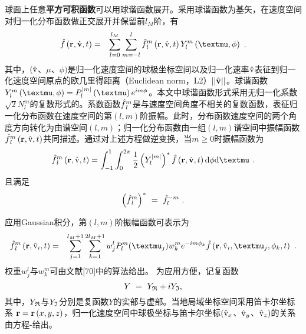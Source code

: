 \begin{theorem} \label{定理-球谐函数展开}
  球面上任意\textbf{平方可积函数}可以用球谐函数展开。采用球谐函数为基矢，在速度空间对归一化分布函数做正交展开并保留前$l_M$阶，有
  \begin{eqnarray}
      \fh \left(\r,\vh,t \right) &=& \sumloq \sumlnl \fhlm \left(\r, \rmvh ,t \right) \Ylm \left(\mu, \phi \right) ~. \label{fhsph}
  \end{eqnarray}
   其中，$(\hat{\mathrm{v}}$、$\mu$、$\phi )$是归一化速度空间的球极坐标空间以及归一化速率$\hat{\mathrm{v}}$表征到归一化速度空间原点的欧几里得距离（Euclidean norm，L2）$||\hat{\mathbf{v}}||$。球谐函数$\Ylm \left(\mu, \phi \right) = \Plmabs  \left(\mu \right) e^{i m \phi}$。本文中球谐函数形式采用无归一化系数$\sqrt{2} N_l^m$的复数形式的。系数函数$\hat{f}{_{l}^m}$是与速度空间角度不相关的复数函数，表征归一化分布函数在速度空间的第$(l,m)$阶振幅。此时，分布函数速度空间的两个角度方向转化为由谱空间$(l,m)$；归一化分布函数由一组$(l,m)$谱空间中振幅函数$\hat{f}{_{l}^m}\left(\mathbf{r}, \hat{\mathrm{v}} ,t \right)$共同描述。通过对上述方程做逆变换，当$m\ge0$时振幅函数为
   \begin{eqnarray}
       \fhlm \left(\r,\rmvh,t \right) =  \int_{-1}^1 \int_0^{2 \pi} \frac{1}{2} \left (Y_l^{\left |m \right|} \right)^* \fh \left (\r, \vh, t \right) \rmd \phi  \rmd \mu ~. \label{fhlm}
   \end{eqnarray}
   且满足
   \begin{equation}
       \left(\hat{f}{_{l}^m} \right)^* \ = \ \hat{f}_{l}^{-m} ~. \label{flmconj}
   \end{equation}
\end{theorem}

应用Gaussian积分，第$(l,m)$阶振幅函数可表示为
    \begin{eqnarray}
      \fhlm \left(\r,\rmvh_i,t \right)  & = & \sum_{j=1}^{l_M+1} \sum_{k=1}^{2l_M+1} w_j^l P_l^m (\mu_j) w_k^m e ^ {-i m \phi_k } \fh \left (\r, \rmvh_i,\mu_j,\phi_k, t \right) ~. \label{flmconjG}
    \end{eqnarray}
权重$w_j^l$与$w_k^m$可由文献[70]中的算法给出。
为应用方便，记复函数
   \begin{equation}
       Y \ = \ Y_{\mathfrak{R}} + i Y_{\mathfrak{I}} , \label{YRI}
   \end{equation}
其中，$Y_{\mathfrak{R}}$与$Y_{\mathfrak{I}}$分别是复函数$Y$的实部与虚部。当地局域坐标空间采用笛卡尔坐标系 $\mathbf{r}=\mathbf{r} \left(x,y,z\right)$，归一化速度空间中球极坐标与笛卡尔坐标$(\hat{\mathrm{v}}_x$、$\hat{\mathrm{v}}_y$、$\hat{\mathrm{v}}_z )$的关系由方程-给出。


